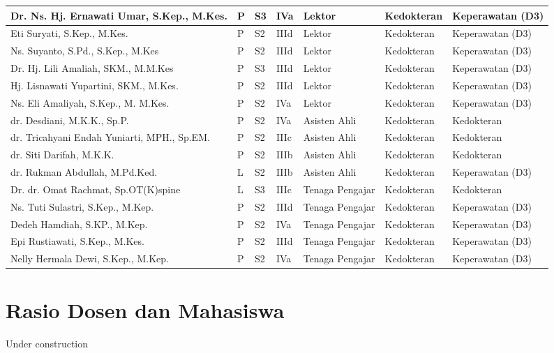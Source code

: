 \documentclass[
]{book}
\begin{document}
\begin{longtable}{l|l|l|l|l|l|l}
\hline
Dr. Ns. Hj. Ernawati Umar, S.Kep., M.Kes. & P & S3 & IVa & Lektor & Kedokteran & Keperawatan (D3)\\
\hline
Eti Suryati, S.Kep., M.Kes. & P & S2 & IIId & Lektor & Kedokteran & Keperawatan (D3)\\
\hline
Ns. Suyanto, S.Pd., S.Kep., M.Kes & P & S2 & IIId & Lektor & Kedokteran & Keperawatan (D3)\\
\hline
Dr. Hj. Lili Amaliah, SKM., M.M.Kes & P & S3 & IIId & Lektor & Kedokteran & Keperawatan (D3)\\
\hline
Hj. Lisnawati Yupartini, SKM., M.Kes. & P & S2 & IIId & Lektor & Kedokteran & Keperawatan (D3)\\
\hline
Ns. Eli Amaliyah, S.Kep., M. M.Kes. & P & S2 & IVa & Lektor & Kedokteran & Keperawatan (D3)\\
\hline
dr. Desdiani, M.K.K., Sp.P. & P & S2 & IVa & Asisten Ahli & Kedokteran & Kedokteran\\
\hline
dr. Tricahyani Endah Yuniarti, MPH., Sp.EM. & P & S2 & IIIc & Asisten Ahli & Kedokteran & Kedokteran\\
\hline
dr. Siti Darifah, M.K.K. & P & S2 & IIIb & Asisten Ahli & Kedokteran & Kedokteran\\
\hline
dr. Rukman Abdullah, M.Pd.Ked. & L & S2 & IIIb & Asisten Ahli & Kedokteran & Keperawatan (D3)\\
\hline
Dr. dr. Omat Rachmat, Sp.OT(K)spine & L & S3 & IIIc & Tenaga Pengajar & Kedokteran & Kedokteran\\
\hline
Ns. Tuti Sulastri, S.Kep., M.Kep. & P & S2 & IIId & Tenaga Pengajar & Kedokteran & Keperawatan (D3)\\
\hline
Dedeh Hamdiah, S.KP., M.Kep. & P & S2 & IVa & Tenaga Pengajar & Kedokteran & Keperawatan (D3)\\
\hline
Epi Rustiawati, S.Kep., M.Kes. & P & S2 & IIId & Tenaga Pengajar & Kedokteran & Keperawatan (D3)\\
\hline
Nelly Hermala Dewi, S.Kep., M.Kep. & P & S2 & IVa & Tenaga Pengajar & Kedokteran & Keperawatan (D3)\\
\hline
\end{longtable}

\hypertarget{rasio-dosen-dan-mahasiswa}{%
\chapter{Rasio Dosen dan Mahasiswa}\label{rasio-dosen-dan-mahasiswa}}

Under construction
\end{document}
